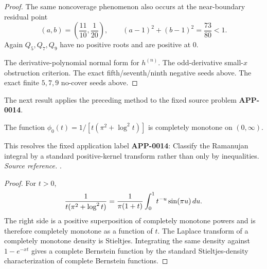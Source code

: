 \begin{proof}
The same noncoverage phenomenon also occurs at the near-boundary residual point
\[
(a,b)=\left(\frac{11}{10},\frac1{20}\right),
\qquad
(a-1)^2+(b-1)^2=\frac{73}{80}<1.
\]
Again \(Q_5,Q_7,Q_9\) have no positive roots and are positive at \(0\).

The derivative-polynomial normal form for \(h^{(n)}\).
The odd-derivative small-\(x\) obstruction criterion.
The exact fifth/seventh/ninth negative seeds above.
The exact finite \(5,7,9\) no-cover seeds above.
\end{proof}

The next result applies the preceding method to the fixed source problem \textbf{APP-0014}.
\begin{corollary}
\label{res:ramanujan-density-logsquare-cm}
The function \(\phi_0(t)=1/[t(\pi^2+\log^2 t)]\) is completely monotone on \((0,\infty)\).

This resolves the fixed application label \textbf{APP-0014}: Classify the Ramanujan integral by a standard positive-kernel transform rather than only by inequalities.
\emph{Source reference.} \cite{app-app-0014-source}.
\end{corollary}
\begin{proof}
For \(t>0\),
\[
 {1\over t(\pi^2+\log^2t)}
   ={1\over \pi(1+t)}\int_0^1 t^{-u}\sin(\pi u)\,du .
\]
The right side is a positive superposition of completely monotone powers and is
therefore completely monotone as a function of \(t\).  The Laplace transform of
a completely monotone density is Stieltjes.  Integrating the same density
against \(1-e^{-xt}\) gives a complete Bernstein function by the standard
Stieltjes-density characterization of complete Bernstein functions.
\end{proof}

